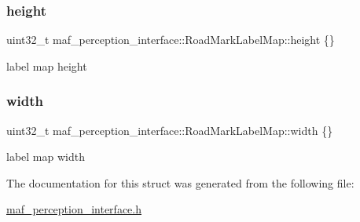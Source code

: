 \subsubsection{\texorpdfstring{height}{height}}
{\footnotesize\ttfamily uint32\+\_\+t maf\+\_\+perception\+\_\+interface\+::\+Road\+Mark\+Label\+Map\+::height \{\}}



label map height 

\mbox{\label{structmaf__perception__interface_1_1RoadMarkLabelMap_a5b7304d96231ec04f6c59dcc944f3170}} 
\subsubsection{\texorpdfstring{width}{width}}
{\footnotesize\ttfamily uint32\+\_\+t maf\+\_\+perception\+\_\+interface\+::\+Road\+Mark\+Label\+Map\+::width \{\}}



label map width 



The documentation for this struct was generated from the following file\+:\begin{DoxyCompactItemize}
\item 
\hyperlink{maf__perception__interface_8h}{maf\+\_\+perception\+\_\+interface.\+h}\end{DoxyCompactItemize}
